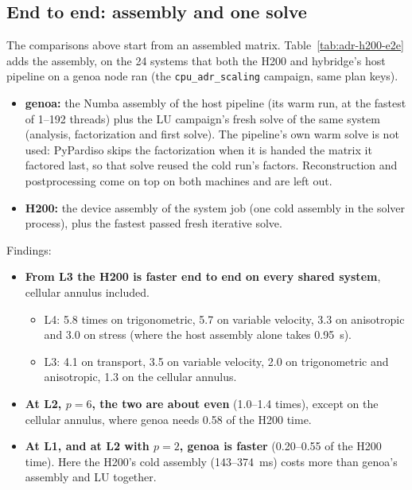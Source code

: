 \subsection{End to end: assembly and one solve}
\label{sec:adr-h200-synth-e2e}

The comparisons above start from an assembled matrix. Table~\ref{tab:adr-h200-e2e} adds the
assembly, on the 24 systems that both the H200 and hybridge's host pipeline on a genoa node ran
(the \texttt{cpu\_adr\_scaling} campaign, same plan keys).
\begin{itemize}
\item \textbf{genoa:} the Numba assembly of the host pipeline (its warm run, at the fastest of
  1--192 threads) plus the LU campaign's fresh solve of the same system (analysis, factorization
  and first solve). The pipeline's own warm solve is not used: PyPardiso skips the factorization
  when it is handed the matrix it factored last, so that solve reused the cold run's factors.
  Reconstruction and postprocessing come on top on both machines and are left out.
\item \textbf{H200:} the device assembly of the system job (one cold assembly in the solver
  process), plus the fastest passed fresh iterative solve.
\end{itemize}
Findings:
\begin{itemize}
\item \textbf{From L3 the H200 is faster end to end on every shared system}, cellular annulus
  included.
  \begin{itemize}
  \item L4: 5.8 times on trigonometric, 5.7 on variable velocity, 3.3 on anisotropic and 3.0 on
    stress (where the host assembly alone takes 0.95~s).
  \item L3: 4.1 on transport, 3.5 on variable velocity, 2.0 on trigonometric and anisotropic,
    1.3 on the cellular annulus.
  \end{itemize}
\item \textbf{At L2, $p=6$, the two are about even} (1.0--1.4 times), except on the cellular
  annulus, where genoa needs 0.58 of the H200 time.
\item \textbf{At L1, and at L2 with $p=2$, genoa is faster} (0.20--0.55 of the H200 time). Here
  the H200's cold assembly (143--374~ms) costs more than genoa's assembly and LU together.
\end{itemize}

\begin{table}[ht]
\centering\scriptsize

\caption{Assembly plus one fresh solve (ms). genoa: host-pipeline assembly at its fastest thread
count plus the LU campaign's fresh solve (subscripts: threads); reconstruction excluded. H200:
device assembly plus the fastest passed fresh iterative solve. Last column: genoa time over H200
time; above one the H200 is faster.}
\label{tab:adr-h200-e2e}
\end{table}

